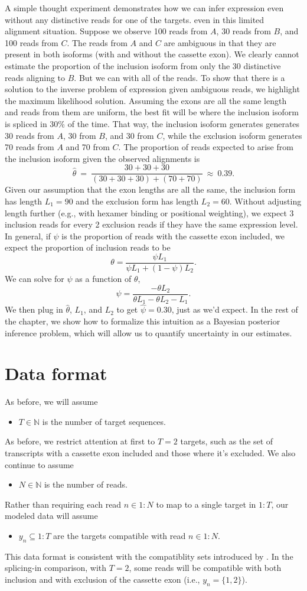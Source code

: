 \documentclass[11pt]{report}
\newcommand{\rngto}[1]{1{:}#1}
\newcommand{\anitem}[1]{\begin{itemize} \item #1 \end{itemize}}
\begin{document}
A simple thought experiment demonstrates how we can infer expression
even without any distinctive reads for one of the targets.  even in
this limited alignment situation. Suppose we observe 100 reads from
$A$, 30 reads from $B$, and 100 reads from $C$.  The reads from $A$
and $C$ are ambiguous in that they are present in both isoforms (with
and without the cassette exon).  We clearly cannot estimate the
proportion of the inclusion isoform from only the 30 distinctive reads
aligning to $B$.  But we can with all of the reads.  To show that
there is a solution to the inverse problem of expression given
ambiguous reads, we highlight the maximum likelihood solution.
Assuming the exons are all the same length and reads from them are
uniform, the best fit will be where the inclusion isoform is spliced
in 30\% of the time. That way, the
inclusion isoform generates generates 30 reads from $A$, 30 from $B$,
and 30 from $C$, while the exclusion isoform generates 70 reads from
$A$ and 70 from $C$.  The proportion of reads expected to arise from the
inclusion isoform given the observed alignments is
\[
  \widehat{\theta} \ = \ \frac{30 + 30 + 30}{(30 + 30 + 30) + (70 + 70)}
  \ \approx \ 0.39.
\]
Given our assumption that the exon lengths are all the same, the
inclusion form has length $L_1 = 90$ and the exclusion form has length
$L_2 = 60$.  Without adjusting length further (e.g., with hexamer
binding or positional weighting), we expect 3 inclusion reads for
every 2 exclusion reads if they have the same expression level.  In
general, if $\psi$ is the proportion of reads with the cassette exon
included, we expect the proportion of inclusion reads to be
\[
  \theta = \frac{\psi L_1}{\psi L_1 + (1 - \psi) L_2}.
\]
We can solve for $\psi$ as a function of $\theta$,
\[
  \psi = \frac{-\theta L_2}{\theta L_1 - \theta L_2 - L_1}.
\]
We then plug in $\widehat{\theta}$, $L_1$, and $L_2$ to get
$\widehat{\psi} = 0.30$, just as we'd expect.  In the rest of the chapter,
we show how to formalize this intuition as a Bayesian posterior
inference problem, which will allow us to quantify uncertainty in our
estimates. 


\section{Data format}

As before, we will assume
%
\anitem{$T \in \mathbb{N}$ is the number of target sequences.}
%
As before, we restrict attention at first to $T = 2$ targets, such as  
the set of transcripts with a cassette exon included and those where  
it's excluded.  We also continue to assume
%
\anitem{$N \in \mathbb{N}$ is the number of reads.}
%
Rather than requiring each read $n \in \rngto{N}$ to map to a single
target in $\rngto{T}$, our modeled data will assume
%
\anitem{$y_n \subseteq \rngto{T}$ are the targets compatible with read
  $n \in \rngto{N}$.}
%
This data format is consistent with the compatiblity sets introduced
by \cite{bray2016near}.  In the splicing-in comparison, with $T = 2$,
some reads will be compatible with both inclusion and with exclusion
of the cassette exon (i.e., $y_n = \{ 1, 2 \}$).
\end{document}
